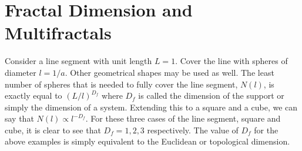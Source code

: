 \section{Fractal Dimension and Multifractals}
\label{sec-MFABASICS}


Consider a line segment with unit length $L=1$.  Cover the line with spheres of diameter $l=1/a$.  Other geometrical shapes may be used as well.  The least number of spheres that is needed to fully cover the line segment, $N(l)$, is exactly equal to $(L/l)^{D_f}$ where $D_f$ is called the dimension of the support or simply the dimension of a system.  Extending this to a square and a cube, we can say that $N(l)\propto l^{-D_f}$.  For these three cases of the line segment, square and cube, it is clear to see that $D_f=1,2,3$ respectively.  The value of $D_f$ for the above examples is simply equivalent to the Euclidean or topological dimension.  

